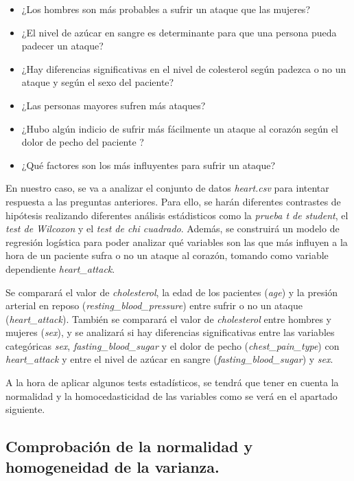 \documentclass[
]{article}
\begin{document}
\begin{itemize}
\item
  ¿Los hombres son más probables a sufrir un ataque que las mujeres?
\item
  ¿El nivel de azúcar en sangre es determinante para que una persona
  pueda padecer un ataque?
\item
  ¿Hay diferencias significativas en el nivel de colesterol según
  padezca o no un ataque y según el sexo del paciente?
\item
  ¿Las personas mayores sufren más ataques?
\item
  ¿Hubo algún indicio de sufrir más fácilmente un ataque al corazón
  según el dolor de pecho del paciente ?
\item
  ¿Qué factores son los más influyentes para sufrir un ataque?
\end{itemize}

En nuestro caso, se va a analizar el conjunto de datos \emph{heart.csv}
para intentar respuesta a las preguntas anteriores. Para ello, se harán
diferentes contrastes de hipótesis realizando diferentes análisis
estádisticos como la \emph{prueba t de student}, el \emph{test de
Wilcoxon} y el \emph{test de chi cuadrado}. Además, se construirá un
modelo de regresión logística para poder analizar qué variables son las
que más influyen a la hora de un paciente sufra o no un ataque al
corazón, tomando como variable dependiente \emph{heart\_attack}.

Se comparará el valor de \emph{cholesterol}, la edad de los pacientes
(\emph{age}) y la presión arterial en reposo
(\emph{resting\_blood\_pressure}) entre sufrir o no un ataque
(\emph{heart\_attack}). También se comparará el valor de
\emph{cholesterol} entre hombres y mujeres (\emph{sex}), y se analizará
si hay diferencias significativas entre las variables categóricas
\emph{sex}, \emph{fasting\_blood\_sugar} y el dolor de pecho
(\emph{chest\_pain\_type}) con \emph{heart\_attack} y entre el nivel de
azúcar en sangre (\emph{fasting\_blood\_sugar}) y \emph{sex}.

A la hora de aplicar algunos tests estadísticos, se tendrá que tener en
cuenta la normalidad y la homocedasticidad de las variables como se verá
en el apartado siguiente.

\hypertarget{comprobaciuxf3n-de-la-normalidad-y-homogeneidad-de-la-varianza.}{%
\subsection{Comprobación de la normalidad y homogeneidad de la
varianza.}\label{comprobaciuxf3n-de-la-normalidad-y-homogeneidad-de-la-varianza.}}
\end{document}

